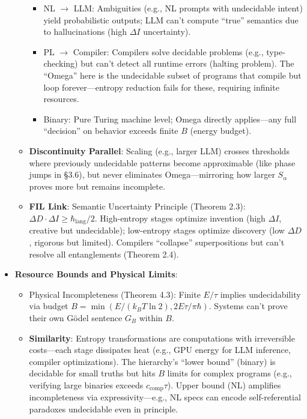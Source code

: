 \documentclass[11pt,letterpaper]{article}
\begin{document}
\begin{itemize}
\begin{itemize}
        \begin{itemize}
            \item NL $\to$ LLM: Ambiguities (e.g., NL prompts with undecidable intent) yield probabilistic outputs; LLM can’t compute “true” semantics due to hallucinations (high $\Delta I$ uncertainty).
            \item PL $\to$ Compiler: Compilers solve decidable problems (e.g., type-checking) but can’t detect all runtime errors (halting problem). The “Omega” here is the undecidable subset of programs that compile but loop forever—entropy reduction fails for these, requiring infinite resources.
            \item Binary: Pure Turing machine level; Omega directly applies—any full “decision” on behavior exceeds finite $B$ (energy budget).
        \end{itemize}
        \item \textbf{Discontinuity Parallel}: Scaling (e.g., larger LLM) crosses thresholds where previously undecidable patterns become approximable (like phase jumps in §3.6), but never eliminates Omega—mirroring how larger $S_\alpha$ proves more but remains incomplete.
        \item \textbf{FIL Link}: Semantic Uncertainty Principle (Theorem 2.3): $\Delta D \cdot \Delta I \geq \hbar_{\text{lang}} / 2$. High-entropy stages optimize invention (high $\Delta I$, creative but undecidable); low-entropy stages optimize discovery (low $\Delta D$, rigorous but limited). Compilers “collapse” superpositions but can’t resolve all entanglements (Theorem 2.4).
    \end{itemize}
    \item \textbf{Resource Bounds and Physical Limits}:
    \begin{itemize}
        \item Physical Incompleteness (Theorem 4.3): Finite $E/\tau$ implies undecidability via budget $B = \min(E / (k_B T \ln 2), 2E\tau / \pi\hbar)$. Systems can’t prove their own Gödel sentence $G_B$ within $B$.
        \item \textbf{Similarity}: Entropy transformations are computations with irreversible costs—each stage dissipates heat (e.g., GPU energy for LLM inference, compiler optimizations). The hierarchy’s “lower bound” (binary) is decidable for small truths but hits $B$ limits for complex programs (e.g., verifying large binaries exceeds $c_{\text{comp}} \tau$). Upper bound (NL) amplifies incompleteness via expressivity—e.g., NL specs can encode self-referential paradoxes undecidable even in principle.

\end{itemize}
\end{itemize}
\end{document}
